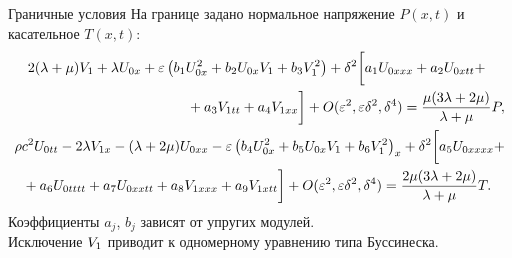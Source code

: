 \documentclass[usenames,dvipsnames]{beamer}
\newcommand{\lb}{\left (}
\newcommand{\rb}{\right )}
\begin{document}
\begin{frame}{Граничные условия}
На границе задано нормальное напряжение $P(x,t)$ и касательное $T(x,t)$:
\small
\begin{align*} \nonumber
\begin{split}
&2 (\lambda + \mu) {\color{black}V_1} + \lambda {\color{black}U_{0x}} +\varepsilon \lb b_1 {\color{black}U_{0x}^2} + b_2 {\color{black}U_{0x}}{\color{black}V_1} + b_3 {\color{black}V_1^2} \rb + \delta^2 \bigg[ a_1 {\color{black}U_{0xxx}} + a_2 {\color{black}U_{0xtt}} +\\
&\hspace{40mm}+ a_3 {\color{black}V_{1tt}} + a_4 {\color{black}V_{1xx}}\bigg] + O(\varepsilon^2, \varepsilon\delta^2, \delta^4) =  \frac{\mu(3\lambda + 2\mu)}{\lambda + \mu} P,
\end{split}\\
\begin{split}
&\rho  c^2 {\color{black}U_{0tt}} -2 \lambda {\color{black}V_{1x}}-(\lambda +2 \mu ) {\color{black}U_{0xx}} - \varepsilon \lb b_4 {\color{black}U_{0x}^2} + b_5 {\color{black}U_{0x}}{\color{black}V_1} + b_6 {\color{black}V_1^2} \rb_x + \delta^2\bigg[a_5 {\color{black}U_{0xxxx}} +\\
&\hspace{2mm}+ a_6 {\color{black}U_{0tttt}} + a_7 {\color{black}U_{0xxtt}} + a_8 {\color{black}V_{1xxx}} + a_9 {\color{black}V_{1xtt}} \bigg] + O(\varepsilon^2, \varepsilon\delta^2, \delta^4) = \frac{2\mu(3\lambda + 2\mu)}{\lambda + \mu} T.
\end{split}
\end{align*}
Коэффициенты $a_j$, $b_j$ зависят от упругих модулей.\\
\vspace{1mm}
\normalsize
Исключение ${\color{black}V_1}$ приводит к одномерному уравнению типа Буссинеска.
\end{frame}
\end{document}
